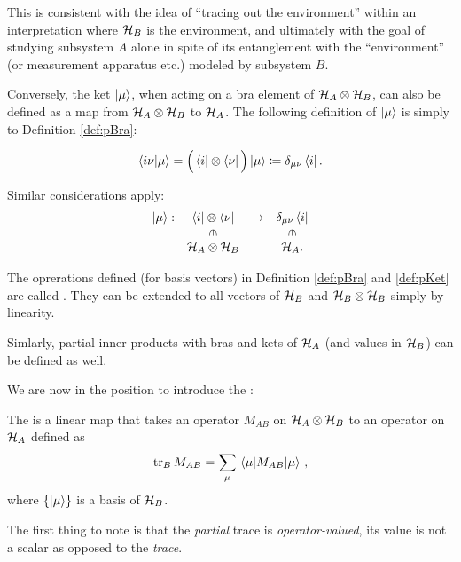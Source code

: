 This is consistent with the idea of
``tracing out the environment'' within an interpretation where
$\mathcal{H}_B$ is the environment, and ultimately with the goal of
studying subsystem $A$ alone in spite of its entanglement with the 
``environment'' (or measurement apparatus etc.) modeled by
subsystem $B$.

Conversely,
the ket $\ket{\mu}$, when acting on a bra element of $\mathcal{H}_{A} \otimes \mathcal{H}_{B}$,
can also be defined
as a map from $\mathcal{H}_A\otimes\mathcal{H}_B$ to $\mathcal{H}_A$.
The following definition of $\ket{\mu}$ is simply  to Definition \ref{def:pBra}:
\begin{definition}\label{def:pKet}
  \[
    \braket{i\nu}{\mu} = \Big(\bra{i}\otimes\bra{\nu}\Big)\ket{\mu} \coloneqq \delta_{\mu\nu}\bra{i} \text{.}
  \]
\end{definition}
Similar considerations apply:
\[
  \begin{array}{cccc}
    \ket{\mu}:  & \bra{i}\ox\bra{\nu}                   & \rightarrow & \delta_{\mu\nu}\bra{i}               \\
                & \rotatebox[origin=c]{270}{$\in$}      &             & \rotatebox[origin=c]{270}{$\in$}      \\
                & \hilb{H}_A\ox\hilb{H}_B               &             & \hilb{H}_A     \text{.}
  \end{array}
\]


The oprerations defined (for basis vectors) in Definition \ref{def:pBra} and \ref{def:pKet}
are called  \parencite[.3]{QMT_Jacobs}.
They can be extended to all vectors of $\mathcal{H}_B$ and $\mathcal{H}_B\otimes\mathcal{H}_B$
simply by linearity.

Simlarly, partial inner products with bras and kets of $\mathcal{H}_A$
(and values in $\mathcal{H}_B$) can be defined as well.

We are now in the position to introduce the :
\begin{definition}\label{def:pTr}
  The 
  is a linear map
  that takes an operator
  $M_{AB}$ on $\mathcal{H}_A \otimes \mathcal{H}_B$
  to an operator on $\mathcal{H}_A$ defined as
  \[
    \tr_B M_{AB} = \sum_{\mu} \matrixel{\mu}{M_{AB}}{\mu}
    \, \text{,}
  \]
  where $\left\{\ket{\mu}\right\}$ is a basis of $\mathcal{H}_B$.
\end{definition}

The first thing to note is that the \emph{partial} trace is \emph{operator-valued},
its value is not a scalar as opposed to the \emph{trace}.

